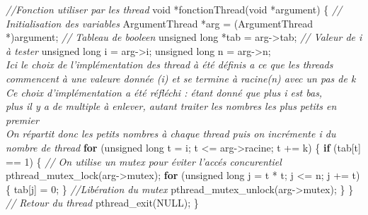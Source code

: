 \documentclass[
    ]{article}
\newenvironment{Shaded}{}{}
\newcommand{\CommentTok}[1]{\textcolor[rgb]{0.38,0.63,0.69}{\textit{#1}}}
\newcommand{\ControlFlowTok}[1]{\textcolor[rgb]{0.00,0.44,0.13}{\textbf{#1}}}
\newcommand{\DataTypeTok}[1]{\textcolor[rgb]{0.56,0.13,0.00}{#1}}
\newcommand{\DecValTok}[1]{\textcolor[rgb]{0.25,0.63,0.44}{#1}}
\newcommand{\NormalTok}[1]{#1}
\begin{document}
\begin{Shaded}
\begin{Highlighting}[]
\CommentTok{//Fonction utiliser par les thread}
\DataTypeTok{void}\NormalTok{ *fonctionThread(}\DataTypeTok{void}\NormalTok{ *argument)}
\NormalTok{\{}
\CommentTok{    // Initialisation des variables}
\NormalTok{    ArgumentThread *arg = (ArgumentThread *)argument;}
    \CommentTok{    // Tableau de booleen}
    \DataTypeTok{unsigned} \DataTypeTok{long}\NormalTok{ *tab = arg{-}\textgreater{}tab;}
    \CommentTok{    // Valeur de i à tester}
    \DataTypeTok{unsigned} \DataTypeTok{long}\NormalTok{ i = arg{-}\textgreater{}i;}
    \DataTypeTok{unsigned} \DataTypeTok{long}\NormalTok{ n = arg{-}\textgreater{}n;}
    \CommentTok{ \\  Ici le choix de l'implémentation des thread à été définis a ce que les threads }
    \CommentTok{ \\ commencent à une valeure donnée (i) et se termine à racine(n) avec un pas de k }
    \CommentTok{ \\ Ce choix d'implémentation a été réfléchi : étant donné que plus i est bas, }
    \CommentTok{ \\ plus il y a de multiple à enlever, autant traiter les nombres les plus petits en premier }
    \CommentTok{ \\ On répartit donc les petits nombres à chaque thread puis on incrémente i du nombre de thread   }
    \ControlFlowTok{for}\NormalTok{ (}\DataTypeTok{unsigned} \DataTypeTok{long}\NormalTok{ t = i; t \textless{}= arg{-}\textgreater{}racine; t += k)}
\NormalTok{    \{}
        \ControlFlowTok{if}\NormalTok{ (tab[t] == }\DecValTok{1}\NormalTok{)}
\NormalTok{        \{}
\CommentTok{            // On utilise un mutex pour éviter l'accés concurentiel}
\NormalTok{            pthread\_mutex\_lock(arg{-}\textgreater{}mutex);}
            \ControlFlowTok{for}\NormalTok{ (}\DataTypeTok{unsigned} \DataTypeTok{long}\NormalTok{ j = t * t; j \textless{}= n; j += t)}
\NormalTok{            \{}
\NormalTok{                tab[j] = }\DecValTok{0}\NormalTok{;}
\NormalTok{            \}}
\CommentTok{      //Libération du mutex}
\NormalTok{            pthread\_mutex\_unlock(arg{-}\textgreater{}mutex);}
\NormalTok{        \}}
\NormalTok{    \}}
\CommentTok{       // Retour du thread}
\NormalTok{    pthread\_exit(NULL);}
\NormalTok{\}}
\end{Highlighting}
\end{Shaded}
\end{document}
